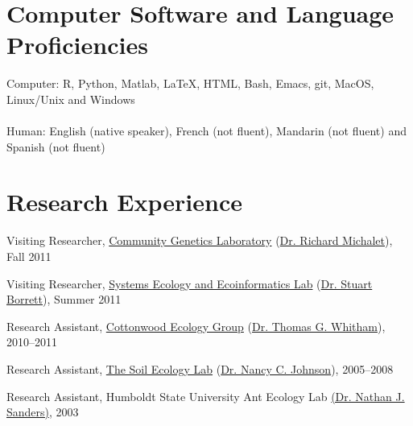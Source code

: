 \documentclass[letterpaper]{article}
\renewenvironment{itemize}{
  \begin{list}{}{
    \setlength{\leftmargin}{1em}
  }
}{
  \end{list}
}
\begin{document}
\section{Computer Software and Language Proficiencies}
Computer: R, Python, Matlab, \LaTeX, HTML, Bash, Emacs, git, MacOS,
Linux/Unix and Windows \\

\\
Human: English (native speaker), French (not fluent), Mandarin (not
fluent) and Spanish (not fluent)

\section{Research Experience}


\begin{itemize}
\item Visiting Researcher,
\href{https://www4.bordeaux-aquitaine.inra.fr/biogeco/}{Community Genetics Laboratory}
(\href{http://www4.bordeaux-aquitaine.inra.fr/biogeco_eng/People/Former-members/Michalet-Richard}{Dr. Richard
Michalet}), Fall 2011
\end{itemize}

\begin{itemize}
\item Visiting Researcher,
\href{http://people.uncw.edu/borretts/}{Systems Ecology and
  Ecoinformatics Lab}
(\href{http://people.uncw.edu/borretts/people.html}{Dr. Stuart Borrett}), Summer 2011
\end{itemize}

\begin{itemize}
\item Research Assistant,
\href{http://www.poplar.nau.edu/}{Cottonwood Ecology Group} (\href{http://www.poplar.nau.edu/people.php?mode=showus&user=tgw}{Dr. Thomas G. Whitham}), 2010--2011
\end{itemize}

\begin{itemize}
\item Research Assistant,
\href{http://www.nau.edu/~envsci/johnsonlab/index.htm}{The Soil Ecology Lab} (\href{http://www.nau.edu/~envsci/johnsonlab/NCJ.htm}{Dr. Nancy C. Johnson}), 2005--2008
\end{itemize}

\begin{itemize}
\item Research Assistant, Humboldt State University Ant Ecology Lab \href{http://web.utk.edu/~nsanders/nate.html}{(Dr. Nathan J. Sanders)},  2003
\end{itemize}
\end{document}
